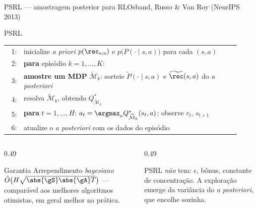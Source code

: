 \documentclass[aspectratio=169, 11pt]{beamer}
\makeatletter
\newcommand{\Mdp}{\mathcal{M}}
\newcommand{\Mtil}{\widetilde{\Mdp}}
\newenvironment{pseudo}[1][0.93\linewidth]{%
  \small\setlength{\tabcolsep}{0pt}%
  \begin{tabular}{@{}r@{\hspace{0.55em}}p{#1}@{}}}%
  {\end{tabular}}
\newcommand{\pln}[1]{{\scriptsize\color{rlCinza}#1:}}
\newcommand{\ind}{\hspace*{1.1em}}
\makeatother
\begin{document}
\begin{frame}{PSRL --- amostragem posterior para RL}{Osband, Russo \& Van Roy (NeurIPS 2013)}
  \vspace{-0.3em}
  \begin{algbox}{PSRL}
    \begin{pseudo}
      \pln{1} & inicialize \textit{a priori} $p(\rec_{s,a})$ e $p\bigl(P(\cdot\mid s,a)\bigr)$
                para cada $(s,a)$ \\
      \pln{2} & \textbf{para} episódio $k = 1,\ldots,K$: \\
      \pln{3} & \ind \textbf{amostre um MDP} $\Mtil_k$: sorteie
                $\widetilde{P}(\cdot\mid s,a)$ e $\widetilde{\rec}(s,a)$ do \textit{a posteriori} \\
      \pln{4} & \ind resolva $\Mtil_k$, obtendo $Q^{*}_{\Mtil_k}$ \\
      \pln{5} & \ind \textbf{para} $t = 1,\ldots,H$:\quad
                $a_t = \argmax_{a} Q^{*}_{\Mtil_k}(s_t, a)$; observe $r_t$, $s_{t+1}$ \\
      \pln{6} & \ind atualize o \textit{a posteriori} com os dados do episódio
    \end{pseudo}
  \end{algbox}
  \vspace{-0.3em}
  \begin{columns}[T]
    \begin{column}{0.49\textwidth}
      \begin{teobox}{Garantia}
        Arrependimento \emph{bayesiano}
        $\tilde{O}\bigl(H\sqrt{\abs{\gS}\abs{\gA}T}\bigr)$ --- comparável aos melhores
        algoritmos otimistas, em geral melhor na prática.
      \end{teobox}
    \end{column}
    \begin{column}{0.49\textwidth}
      \begin{ideiabox}
        PSRL \emph{não} tem: $\epsilon$, bônus, constante de concentração. A exploração
        emerge da variância do \textit{a posteriori}, que encolhe sozinha.
      \end{ideiabox}
    \end{column}
  \end{columns}
\end{frame}
\end{document}
